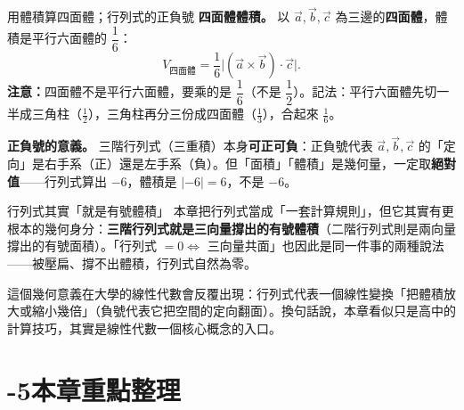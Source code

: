 \documentclass[11pt]{article}
\begin{document}
\begin{補充框}{用體積算四面體；行列式的正負號}
\textbf{四面體體積。} 以 $\vec a,\vec b,\vec c$ 為三邊的\textbf{四面體}，體積是平行六面體的 $\dfrac16$：
$$V_{\text{四面體}}=\frac16\bigl|(\vec a\times\vec b)\cdot\vec c\bigr|.$$
\textbf{注意：}四面體不是平行六面體，要乘的是 $\dfrac16$（不是 $\dfrac12$）。記法：平行六面體先切一半成三角柱（$\tfrac12$），三角柱再分三份成四面體（$\tfrac13$），合起來 $\tfrac16$。

\textbf{正負號的意義。} 三階行列式（三重積）本身\textbf{可正可負}：正負號代表 $\vec a,\vec b,\vec c$ 的「定向」是右手系（正）還是左手系（負）。但「面積」「體積」是幾何量，一定取\textbf{絕對值}——行列式算出 $-6$，體積是 $|-6|=6$，不是 $-6$。
\end{補充框}

\begin{延伸框}{行列式其實「就是有號體積」}
本章把行列式當成「一套計算規則」，但它其實有更根本的幾何身分：\textbf{三階行列式就是三向量撐出的有號體積}（二階行列式則是兩向量撐出的有號面積）。「行列式 $=0\iff$ 三向量共面」也因此是同一件事的兩種說法——被壓扁、撐不出體積，行列式自然為零。

這個幾何意義在大學的線性代數會反覆出現：行列式代表一個線性變換「把體積放大或縮小幾倍」（負號代表它把空間的定向翻面）。換句話說，本章看似只是高中的計算技巧，其實是線性代數一個核心概念的入口。
\end{延伸框}

\section*{-5\quad 本章重點整理}
\end{document}
